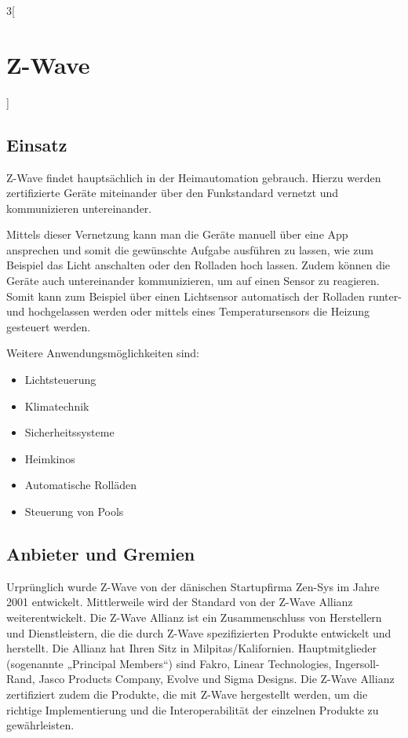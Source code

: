 \begin{multicols}{3}[\section{Z-Wave}]
\subsection*{Einsatz}
Z-Wave findet hauptsächlich in der Heimautomation gebrauch. Hierzu werden zertifizierte Geräte miteinander über den Funkstandard vernetzt und kommunizieren untereinander.

Mittels dieser Vernetzung kann man die Geräte manuell über eine App ansprechen und somit die gewünschte Aufgabe ausführen zu lassen, wie zum Beispiel das Licht anschalten oder den Rolladen hoch lassen. Zudem können die Geräte auch untereinander kommunizieren, um auf einen Sensor zu reagieren. Somit kann zum Beispiel über einen Lichtsensor automatisch der Rolladen runter- und hochgelassen werden oder mittels eines Temperatursensors die Heizung gesteuert werden.

Weitere Anwendungsmöglichkeiten sind:
\begin{itemize}
	\item Lichtsteuerung
	\item Klimatechnik
	\item Sicherheitssysteme
	\item Heimkinos
	\item Automatische Rolläden
	\item Steuerung von Pools
\end{itemize}

\subsection*{Anbieter und Gremien}
Urprünglich wurde Z-Wave von der dänischen Startupfirma Zen-Sys im Jahre 2001 entwickelt. Mittlerweile wird der Standard von der Z-Wave Allianz weiterentwickelt. Die Z-Wave Allianz ist ein Zusammenschluss von Herstellern und Dienstleistern, die die durch Z-Wave spezifizierten Produkte entwickelt und herstellt. Die Allianz hat Ihren Sitz in Milpitas/Kalifornien. Hauptmitglieder (sogenannte „Principal Members“) sind Fakro, Linear Technologies, Ingersoll-Rand, Jasco Products Company, Evolve und Sigma Designs. \cite{zwave.2} Die Z-Wave Allianz zertifiziert zudem die Produkte, die mit Z-Wave hergestellt werden, um die richtige Implementierung und die Interoperabilität der einzelnen Produkte zu gewährleisten.

\end{multicols}
\newpage


